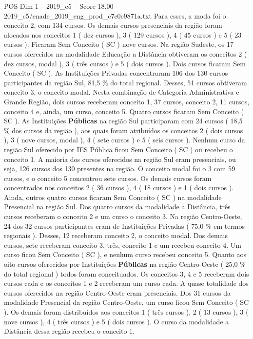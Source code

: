 \begin{textsample}{POS Dim 1 – 2019\_c5 – Score 18.00 – 2019\_c5/enade\_2019\_eng\_prod\_c7c0e9871a.txt}
Para esses, a moda foi o conceito 2, com 134 cursos.
Os demais cursos presenciais da região foram alocados nos conceitos 1 ( dez cursos ), 3 ( 129 cursos ), 4 ( 45 cursos ) e 5 ( 23 cursos ).
Ficaram Sem Conceito ( SC ) nove cursos.
Na região Sudeste, os 17 cursos oferecidos na modalidade Educação a Distância obtiveram os conceitos 2 ( dez cursos, modal ), 3 ( três cursos ) e 5 ( dois cursos ).
Dois cursos ficaram Sem Conceito ( SC ).
As Instituições Privadas concentraram 106 dos 130 cursos participantes da região Sul, 81,5 \% do total regional.
Desses, 51 cursos obtiveram conceito 3, o conceito modal.
Nesta combinação de Categoria Administrativa e Grande Região, dois cursos receberam conceito 1, 37 cursos, conceito 2, 11 cursos, conceito 4 e, ainda, um curso, conceito 5.
Quatro cursos ficaram Sem Conceito ( SC ).
As Instituições \textbf{Públicas} na região Sul participaram com 24 cursos ( 18,5 \% dos cursos da região ), aos quais foram atribuídos os conceitos 2 ( dois cursos ), 3 ( nove cursos, modal ), 4 ( sete cursos ) e 5 ( seis cursos ).
Nenhum curso da região Sul oferecido por IES Pública ficou Sem Conceito ( SC ) ou recebeu o conceito 1.
A maioria dos cursos oferecidos na região Sul eram presenciais, ou seja, 126 cursos dos 130 presentes na região.
O conceito modal foi o 3 com 59 cursos, e o conceito 5 concentrou sete cursos.
Os demais cursos foram concentrados nos conceitos 2 ( 36 cursos ), 4 ( 18 cursos ) e 1 ( dois cursos ).
Ainda, outros quatro cursos ficaram Sem Conceito ( SC ) na modalidade Presencial na região Sul.
Dos quatro cursos da modalidade a Distância, três cursos receberam o conceito 2 e um curso o conceito 3.
Na região Centro-Oeste, 24 dos 32 cursos participantes eram de Instituições Privadas ( 75,0 \% em termos regionais ).
Desses, 12 receberam conceito 2, o conceito modal.
Dos demais cursos, sete receberam conceito 3, três, conceito 1 e um recebeu conceito 4.
Um curso ficou Sem Conceito ( SC ), e nenhum curso recebeu conceito 5.
Quanto aos oito cursos oferecidos por Instituições \textbf{Públicas} na região Centro-Oeste ( 25,0 \% do total regional ) todos foram conceituados.
Os conceitos 3, 4 e 5 receberam dois cursos cada e os conceitos 1 e 2 receberam um curso cada.
A quase totalidade dos cursos oferecidos na região Centro-Oeste eram presenciais.
Dos 31 cursos da modalidade Presencial da região Centro-Oeste, um curso ficou Sem Conceito ( SC ).
Os demais foram distribuídos aos conceitos 1 ( três cursos ), 2 ( 13 cursos ), 3 ( nove cursos ), 4 ( três cursos ) e 5 ( dois cursos ).
O curso da modalidade a Distância dessa região recebeu o conceito 1.

\end{textsample}
